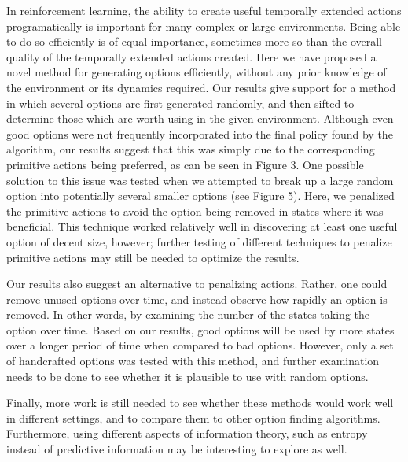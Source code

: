 \documentclass{acm_proc_article-sp}
\begin{document}
In reinforcement learning, the ability to create useful temporally extended actions programatically is important for many complex or large environments. Being able to do so efficiently is of equal importance, sometimes more so than the overall quality of the temporally extended actions created. Here we have proposed a novel method for generating options efficiently, without any prior knowledge of the environment or its dynamics required. Our results give support for a method in which several options are first generated randomly, and then sifted to determine those which are worth using in the given environment.   
	Although even good options were not frequently incorporated into the final policy found by the algorithm, our results suggest that this was simply due to the corresponding primitive actions being preferred, as can be seen in Figure 3. One possible solution to this issue was tested when we attempted to break up a large random option into potentially several smaller options (see Figure 5).
	Here, we penalized the primitive actions to avoid the option being removed in states where it was beneficial. This technique worked relatively well in discovering at least one useful option of decent size, however; further testing of different techniques to penalize primitive actions may still be needed to optimize the results. 
	
	Our results also suggest an alternative to penalizing actions. Rather, one could remove unused options over time, and instead observe how rapidly an option is removed. In other words, by examining the number of the states taking the option over time. Based on our results, good options will be used by more states over a longer period of time when compared to bad options. However, only a set of handcrafted options was tested with this method, and further examination needs to be done to see whether it is plausible to use with random options.
	
	Finally, more work is still needed to see whether these methods would work well in different settings, and to compare them to other option finding algorithms. Furthermore, using different aspects of information theory, such as entropy instead of predictive information may be interesting to explore as well.	

\end{document}
